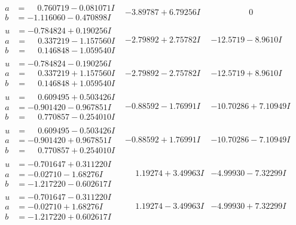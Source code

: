 \documentclass[1p]{elsarticle_modified}
\theoremstyle{definition}
\begin{document}
$$\begin{array}{c|c|c}
\begin{aligned}
a &= \phantom{-}0.760719 - 0.081071 I \\
b &= -1.116060 - 0.470898 I\end{aligned}
 & -3.89787 + 6.79256 I & \phantom{-0.000000 } 0 \\ \hline\begin{aligned}
u &= -0.784824 + 0.190256 I \\
a &= \phantom{-}0.337219 - 1.157560 I \\
b &= \phantom{-}0.146848 - 1.059540 I\end{aligned}
 & -2.79892 + 2.75782 I & -12.5719 - 8.9610 I \\ \hline\begin{aligned}
u &= -0.784824 - 0.190256 I \\
a &= \phantom{-}0.337219 + 1.157560 I \\
b &= \phantom{-}0.146848 + 1.059540 I\end{aligned}
 & -2.79892 - 2.75782 I & -12.5719 + 8.9610 I \\ \hline\begin{aligned}
u &= \phantom{-}0.609495 + 0.503426 I \\
a &= -0.901420 - 0.967851 I \\
b &= \phantom{-}0.770857 - 0.254010 I\end{aligned}
 & -0.88592 - 1.76991 I & -10.70286 + 7.10949 I \\ \hline\begin{aligned}
u &= \phantom{-}0.609495 - 0.503426 I \\
a &= -0.901420 + 0.967851 I \\
b &= \phantom{-}0.770857 + 0.254010 I\end{aligned}
 & -0.88592 + 1.76991 I & -10.70286 - 7.10949 I \\ \hline\begin{aligned}
u &= -0.701647 + 0.311220 I \\
a &= -0.02710 - 1.68276 I \\
b &= -1.217220 - 0.602617 I\end{aligned}
 & \phantom{-}1.19274 + 3.49963 I & -4.99930 - 7.32299 I \\ \hline\begin{aligned}
u &= -0.701647 - 0.311220 I \\
a &= -0.02710 + 1.68276 I \\
b &= -1.217220 + 0.602617 I\end{aligned}
 & \phantom{-}1.19274 - 3.49963 I & -4.99930 + 7.32299 I \\ \hline\begin{aligned}

\end{aligned}
\end{array}$$
\end{document}
